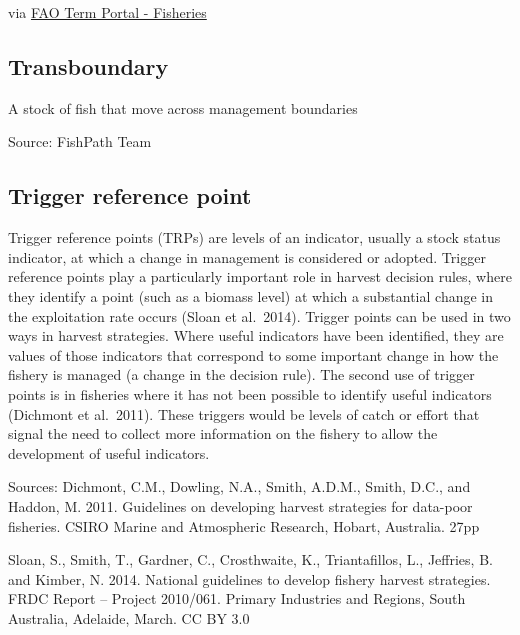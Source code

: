 \documentclass[
  11pt,
]{book}
\begin{document}
via \href{http://www.fao.org/fishery/glossary/en}{FAO Term Portal - Fisheries}

\hypertarget{transboundary}{%
\subsection{Transboundary}\label{transboundary}}

A stock of fish that move across management boundaries

Source: FishPath Team

\hypertarget{trigger-reference-point}{%
\subsection{Trigger reference point}\label{trigger-reference-point}}

Trigger reference points (TRPs) are levels of an indicator, usually a stock status indicator, at which a change in management is considered or adopted. Trigger reference points play a particularly important role in harvest decision rules, where they identify a point (such as a biomass level) at which a substantial change in the exploitation rate occurs (Sloan et al.~2014). Trigger points can be used in two ways in harvest strategies. Where useful indicators have been identified, they are values of those indicators that correspond to some important change in how the fishery is managed (a change in the decision rule). The second use of trigger points is in fisheries where it has not been possible to identify useful indicators (Dichmont et al.~2011). These triggers would be levels of catch or effort that signal the need to collect more information on the fishery to allow the development of useful indicators.

Sources: Dichmont, C.M., Dowling, N.A., Smith, A.D.M., Smith, D.C., and Haddon, M. 2011. Guidelines on developing harvest strategies for data-poor fisheries. CSIRO Marine and Atmospheric Research, Hobart, Australia. 27pp

Sloan, S., Smith, T., Gardner, C., Crosthwaite, K., Triantafillos, L., Jeffries, B. and Kimber, N. 2014. National guidelines to develop fishery harvest strategies. FRDC Report -- Project 2010/061. Primary Industries and Regions, South Australia, Adelaide, March. CC BY 3.0

  
\end{document}
